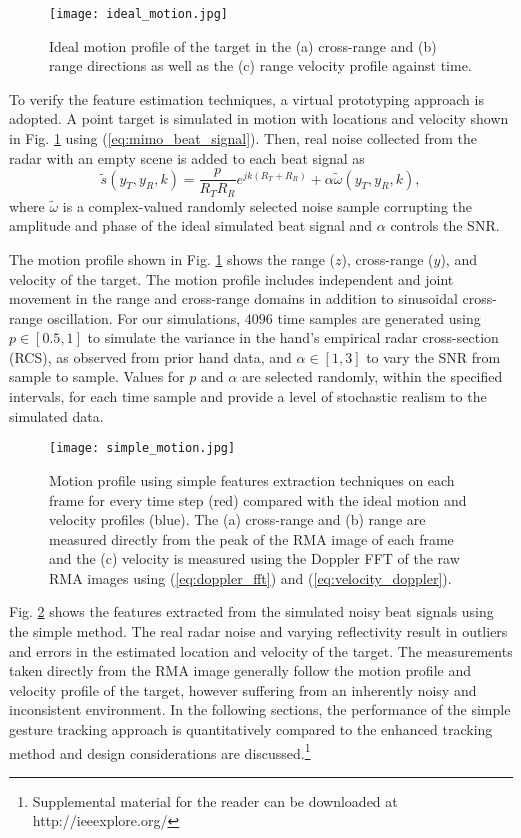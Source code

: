 \documentclass[10pt,journal,final]{IEEEtran}
\begin{document}
\begin{figure}[h]
	\centering
	\texttt{[image: ideal\_motion.jpg]}
	\caption{Ideal motion profile of the target in the (a) cross-range and (b) range directions as well as the (c) range velocity profile against time.}
	\label{fig:ideal_motion}
\end{figure}

To verify the feature estimation techniques, a virtual prototyping approach is adopted. A point target is simulated in motion with locations and velocity shown in Fig. \ref{fig:ideal_motion} using (\ref{eq:mimo_beat_signal}). Then, real noise collected from the radar with an empty scene is added to each beat signal as
\begin{equation}
	\tilde{s}(y_T,y_R,k) = \frac{p}{R_T R_R}e^{jk(R_T + R_R)} + \alpha \tilde{ \omega}(y_T,y_R,k),
\end{equation}
where $\tilde{ \omega}$ is a complex-valued randomly selected noise sample corrupting the amplitude and phase of the ideal simulated beat signal and $\alpha$ controls the SNR.

The motion profile shown in Fig. \ref{fig:ideal_motion} shows the range ($z$), cross-range ($y$), and velocity of the target. The motion profile includes independent and joint movement in the range and cross-range domains in addition to sinusoidal cross-range oscillation. For our simulations, $4096$ time samples are generated using $p \in [0.5,1]$ to simulate the variance in the hand's empirical radar cross-section (RCS), as observed from prior hand data, and $\alpha \in [1,3]$ to vary the SNR from sample to sample. Values for $p$ and $\alpha$ are selected randomly, within the specified intervals, for each time sample and provide a level of stochastic realism to the simulated data.

\begin{figure}[h]
	\centering
	\texttt{[image: simple\_motion.jpg]}
	\caption{Motion profile using simple features extraction techniques on each frame for every time step (red) compared with the ideal motion and velocity profiles (blue). The (a) cross-range and (b) range are measured directly from the peak of the RMA image of each frame and the (c) velocity is measured using the Doppler FFT of the raw RMA images using (\ref{eq:doppler_fft}) and (\ref{eq:velocity_doppler}).}
	\label{fig:simple_motion}
\end{figure}

Fig. \ref{fig:simple_motion} shows the features extracted from the simulated noisy beat signals using the simple method. The real radar noise and varying reflectivity result in outliers and errors in the estimated location and velocity of the target. The measurements taken directly from the RMA image generally follow the motion profile and velocity profile of the target, however suffering from an inherently noisy and inconsistent environment. In the following sections, the performance of the simple gesture tracking approach is quantitatively compared to the enhanced tracking method and design considerations are discussed.\footnote{Supplemental material for the reader can be downloaded at http://ieeexplore.org/}
\end{document}
